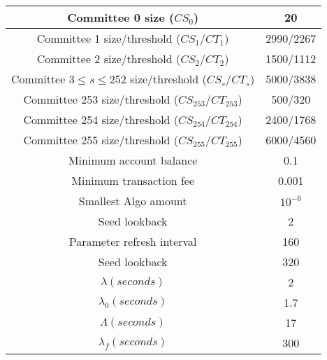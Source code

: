 \documentclass[../main.tex]{subfiles}
\begin{document}
\begin{center}
\begin{tabular}{ |c|c| } 
 \hline
 Committee 0 size ($CS_0$) & 20 \\ 
 \hline
 Committee 1 size/threshold ($CS_1/CT_1$) & 2990/2267 \\ 
 \hline
 Committee 2 size/threshold ($CS_2/CT_2$) & 1500/1112 \\ 
 \hline
 Committee 3$\leq s \leq$252 size/threshold ($CS_s/CT_s$) &  5000/3838 \\ 
 \hline
 Committee 253 size/threshold ($CS_{253}/CT_{253}$) & 500/320 \\ 
 \hline
 Committee 254 size/threshold ($CS_{254}/CT_{254}$) & 2400/1768 \\ 
 \hline
 Committee 255 size/threshold ($CS_{255}/CT_{255}$) & 6000/4560 \\ 
 \hline
 Minimum account balance & 0.1\\
 \hline
 Minimum transaction fee & 0.001\\
 \hline
 Smallest Algo amount & $10^{-6}$\\
 \hline
 Seed lookback & 2\\
 \hline
 Parameter refresh interval & 160\\
 \hline
 Seed lookback & 320\\
 \hline
 $\lambda (seconds)$ & 2\\
 \hline
 $\lambda_0 (seconds)$ & 1.7\\
 \hline
 $\Lambda (seconds)$ & 17\\
 \hline
 $\lambda_f (seconds)$ & 300\\
 \hline
\end{tabular}
\end{center}
\end{document}

